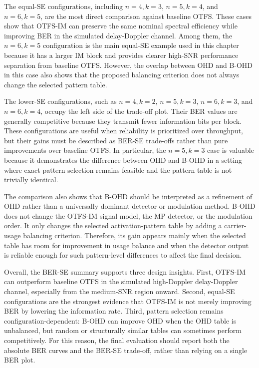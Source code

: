 The equal-SE configurations, including \(n=4,k=3\), \(n=5,k=4\), and \(n=6,k=5\), are the most direct comparison against baseline OTFS. These cases show that OTFS-IM can preserve the same nominal spectral efficiency while improving BER in the simulated delay-Doppler channel. Among them, the \(n=6,k=5\) configuration is the main equal-SE example used in this chapter because it has a larger IM block and provides clearer high-SNR performance separation from baseline OTFS. However, the overlap between OHD and B-OHD in this case also shows that the proposed balancing criterion does not always change the selected pattern table.

The lower-SE configurations, such as \(n=4,k=2\), \(n=5,k=3\), \(n=6,k=3\), and \(n=6,k=4\), occupy the left side of the trade-off plot. Their BER values are generally competitive because they transmit fewer information bits per block. These configurations are useful when reliability is prioritized over throughput, but their gains must be described as BER-SE trade-offs rather than pure improvements over baseline OTFS. In particular, the \(n=5,k=3\) case is valuable because it demonstrates the difference between OHD and B-OHD in a setting where exact pattern selection remains feasible and the pattern table is not trivially identical.

The comparison also shows that B-OHD should be interpreted as a refinement of OHD rather than a universally dominant detector or modulation method. B-OHD does not change the OTFS-IM signal model, the MP detector, or the modulation order. It only changes the selected activation-pattern table by adding a carrier-usage balancing criterion. Therefore, its gain appears mainly when the selected table has room for improvement in usage balance and when the detector output is reliable enough for such pattern-level differences to affect the final decision.

Overall, the BER-SE summary supports three design insights. First, OTFS-IM can outperform baseline OTFS in the simulated high-Doppler delay-Doppler channel, especially from the medium-SNR region onward. Second, equal-SE configurations are the strongest evidence that OTFS-IM is not merely improving BER by lowering the information rate. Third, pattern selection remains configuration-dependent: B-OHD can improve OHD when the OHD table is unbalanced, but random or structurally similar tables can sometimes perform competitively. For this reason, the final evaluation should report both the absolute BER curves and the BER-SE trade-off, rather than relying on a single BER plot.

